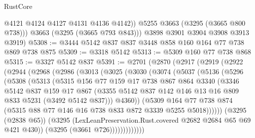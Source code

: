 \begin{lexlean}{RustCore}
\begin{coremodule}
              @4121
              @4124
              @4127
              @4131
              @4136
              @4142))
          @5255
          @3663
          (@3295 (@3665 @800 @738)))
        @3663
        (@3295 (@3665 @793 @843)))
      @3898
      @3901
      @3904
      @3908
      @3913
      @3919)
@5308 := @3444 @5142 @837 @837 @3448 @858 @160 @164 @77 @738 @869 @738 @875
@5309 := @3318 @5142
@5313 := @5309 @160 @77 @738 @868
@5315 := @3327 @5142 @837
@5391 := @2701
    (@2870
      (@2917
        (@2919
          (@2922
            (@2944
              (@2968
                (@2986
                  (@3013
                    (@3025
                      (@3030
                        (@3074
                          (@5037
                            (@5136
                              (@5296
                                (@5308
                                  (@5313
                                    (@5315
                                      @156
                                      @77
                                      @159
                                      @17
                                      @738
                                      @867
                                      @864
                                      @3340
                                      (@3346
                                        @5142
                                        @837
                                        @159
                                        @17
                                        @867
                                        (@3355
                                          @5142
                                          @837
                                          @142
                                          @146
                                          @13
                                          @16
                                          @809
                                          @833
                                          @5231
                                          (@3492 @5142 @837)))
                                      @4360))
                                  (@5309
                                    @164
                                    @77
                                    @738
                                    @874
                                    (@5315 @88 @77 @146 @16 @738 @833 @872 @3339 @5255 @5018))))))
                          (@3295 (@2838 @65))
                          (@3295 (LexLeanPreservation.Rust.covered @2682 @2684 @65 @69 @421 @430))
                          (@3295 (@3661 @726)))))))))))))

\end{coremodule}
\end{lexlean}
